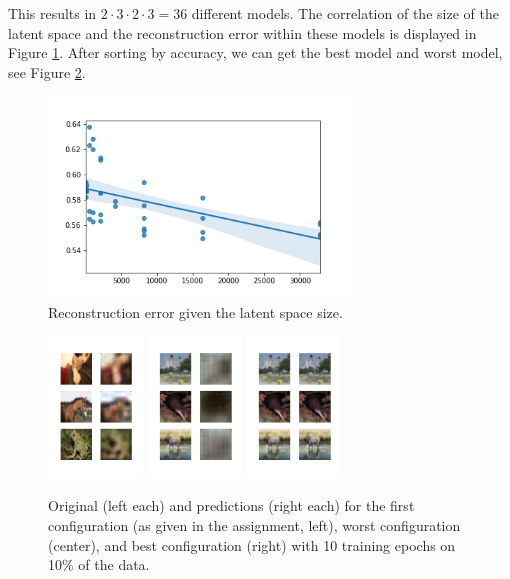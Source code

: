\documentclass[conference]{IEEEtran}
\begin{document}
This results in $2\cdot3\cdot2\cdot3=36$ different models. The correlation of the size of the latent space and the reconstruction error within these models is displayed in Figure \ref{fig:re}. After sorting by accuracy, we can get the best model and worst model, see Figure \ref{fig:bestandworst}.

\begin{figure}
    \centering
    \includegraphics[width=8cm]{reconstruction_error_vs_latent_space_size.png}
    \caption{Reconstruction error given the latent space size.}
    \label{fig:re}
\end{figure}

\begin{figure}
    \centering
    \includegraphics[width=2.5cm]{first.png}
    \includegraphics[width=2.5cm]{worst.png}
    \includegraphics[width=2.5cm]{best_10.png}
    \caption{Original (left each) and predictions (right each) for the first configuration (as given in the assignment, left), worst configuration (center), and best configuration (right) with 10 training epochs on 10\% of the data. }
    \label{fig:bestandworst}
\end{figure}
\end{document}
